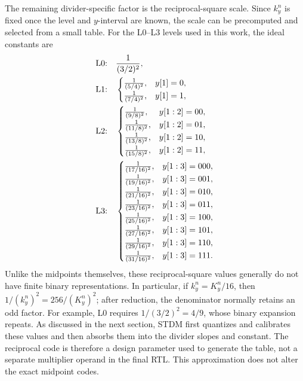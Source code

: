 \documentclass[conference]{IEEEtran}
\begin{document}
The remaining divider-specific factor is the reciprocal-square scale. Since
$k_y^n$ is fixed once the level and $y$-interval are known, the scale can be
precomputed and selected from a small table. For the L0--L3 levels used in this
work, the ideal constants are
\begin{align}
\text{L0:}\quad & {1\over(3/2)^2}, \nonumber\\
\text{L1:}\quad &
\begin{cases}
{1\over(5/4)^2}, & y[1]=0,\\
{1\over(7/4)^2}, & y[1]=1,
\end{cases} \nonumber\\
\text{L2:}\quad &
\begin{cases}
{1\over(9/8)^2},  & y[1:2]=00,\\
{1\over(11/8)^2}, & y[1:2]=01,\\
{1\over(13/8)^2}, & y[1:2]=10,\\
{1\over(15/8)^2}, & y[1:2]=11,
\end{cases} \nonumber\\
\text{L3:}\quad &
\begin{cases}
{1\over(17/16)^2}, & y[1:3]=000,\\
{1\over(19/16)^2}, & y[1:3]=001,\\
{1\over(21/16)^2}, & y[1:3]=010,\\
{1\over(23/16)^2}, & y[1:3]=011,\\
{1\over(25/16)^2}, & y[1:3]=100,\\
{1\over(27/16)^2}, & y[1:3]=101,\\
{1\over(29/16)^2}, & y[1:3]=110,\\
{1\over(31/16)^2}, & y[1:3]=111.
\end{cases}
\label{eq:recip_table}
\end{align}
Unlike the midpoints themselves, these reciprocal-square values generally do
not have finite binary representations. In particular, if
$k_y^n=K_y^n/16$, then $1/(k_y^n)^2=256/(K_y^n)^2$; after reduction, the
denominator normally retains an odd factor. For example, L0 requires
$1/(3/2)^2=4/9$, whose binary expansion repeats. As discussed in the next
section, STDM first quantizes and calibrates these values and then absorbs them
into the divider slopes and constant. The reciprocal code is therefore a
design parameter used to generate the table, not a separate multiplier operand
in the final RTL. This approximation does not alter the exact midpoint codes.

\iffalse
\end{document}
